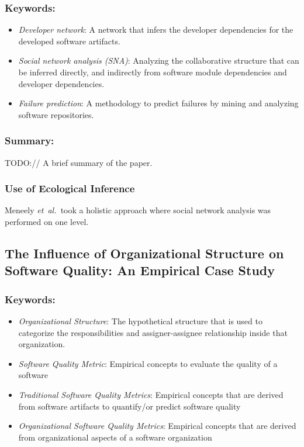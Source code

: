 \documentclass{sig-alternate-05-2015}
\newcommand{\etal}{\mbox{\emph{et al.\ }}}
\begin{document}
\subsubsection{Keywords:}
\begin{itemize}
\item \emph{Developer network}: A network that infers the developer dependencies for the developed software artifacts.
\item \emph{Social network analysis (SNA)}: Analyzing the collaborative structure that can be inferred directly, and indirectly from software module dependencies and developer dependencies.
\item \emph{Failure prediction}: A methodology to predict failures by mining and analyzing software repositories.
\end{itemize} 

\subsubsection{Summary:}
TODO:// A brief summary of the paper.

\subsubsection{Use of Ecological Inference}
Meneely \etal took a holistic approach where social network analysis was performed on one level.

\subsection{The Influence of Organizational Structure on Software Quality: An Empirical Case Study \cite{Nagappan:2008}}

\subsubsection{Keywords:}
\begin{itemize}
\item \emph{Organizational Structure}: The hypothetical structure that is used to categorize the responsibilities and assigner-assignee relationship inside that organization.
\item \emph{Software Quality Metric}: Empirical concepts to evaluate the quality of a software
\item \emph{Traditional Software Quality Metrics}: Empirical concepts that are derived from software artifacts to quantify/or predict software quality
\item \emph{Organizational Software Quality Metrics}: Empirical concepts that are derived from organizational aspects of a software organization
\end{itemize} 
\end{document}
